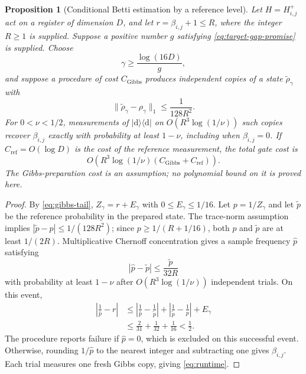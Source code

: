 \documentclass[a4paper,onecolumn,unpublished]{quantumarticle}
\theoremstyle{plain}
\newtheorem{proposition}[theorem]{Proposition}
\theoremstyle{definition}
\theoremstyle{definition}
\numberwithin{equation}{section}
\begin{document}
\begin{proposition}[Conditional Betti estimation by a reference level]
\label{thm:conditional-estimator}
\label{prop:reference-readout}
Let $H=H^+_{i,j}$ act on a register of dimension $D$, and let
$r=\beta_{i,j}+1\le R$, where the integer $R\ge1$ is supplied.
Suppose a positive number $g$ satisfying
\cref{eq:target-gap-promise} is supplied. Choose
\[
 \gamma\ge\frac{\log(16D)}{g},
\]
and suppose a procedure of cost $C_{\mathrm{Gibbs}}$ produces
independent copies of a state $\widetilde\rho_\gamma$ with
\[
 \|\widetilde\rho_\gamma-\rho_\gamma\|_1
       \le\frac1{128R^2}.
\]
For $0<\nu<1/2$, measurements of
$|\mathrm d\rangle\!\langle\mathrm d|$ on
$O(R^3\log(1/\nu))$ such copies recover $\beta_{i,j}$
exactly with probability at least $1-\nu$, including when
$\beta_{i,j}=0$. If $C_{\mathrm{ref}}=O(\log D)$ is the
cost of the reference measurement, the total gate cost is
\begin{equation}\label{eq:runtime}
 O\!\left(R^3\log(1/\nu)
           (C_{\mathrm{Gibbs}}+C_{\mathrm{ref}})\right).
\end{equation}
The Gibbs-preparation cost is an assumption; no polynomial
bound on it is proved here.
\end{proposition}

\begin{proof}
By \cref{eq:gibbs-tail}, $Z_\gamma=r+E_\gamma$ with
$0\le E_\gamma\le1/16$.
Let $p=1/Z_\gamma$ and let $\widetilde p$ be the reference
probability in the prepared state. The trace-norm assumption
implies $|\widetilde p-p|\le1/(128R^2)$; since
$p\ge1/(R+1/16)$, both $p$ and $\widetilde p$ are at
least $1/(2R)$.
Multiplicative Chernoff concentration gives a sample frequency
$\widehat p$ satisfying
\[
 |\widehat p-\widetilde p|
       \le\frac{\widetilde p}{32R}
\]
with probability at least $1-\nu$ after
$O(R^3\log(1/\nu))$ independent trials. On this event,
\begin{align*}
 \left|\frac1{\widehat p}-r\right|
 &\le \left|\frac1{\widehat p}-\frac1{\widetilde p}\right|
       +\left|\frac1{\widetilde p}-\frac1p\right|+E_\gamma\\
 &\le\frac2{31}+\frac1{32}+\frac1{16}<\frac12.
\end{align*}
The procedure reports failure if $\widehat p=0$, which is
excluded on this successful event. Otherwise, rounding
$1/\widehat p$ to the nearest integer and subtracting
one gives $\beta_{i,j}$. Each trial measures one
fresh Gibbs copy, giving \cref{eq:runtime}.
\end{proof}
\end{document}
